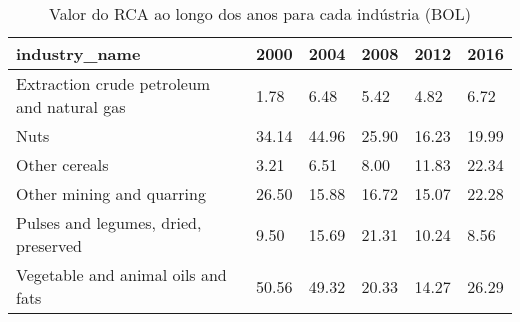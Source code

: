 \begin{table}
\centering
\caption{Valor do RCA ao longo dos anos para cada indústria (BOL)}
\begin{tabular}{p{6cm}p{1.5cm}p{1.5cm}p{1.5cm}p{1.5cm}p{1.5cm}}
\toprule
                             industry\_name &  2000 &  2004 &  2008 &  2012 &  2016 \\
\midrule
Extraction crude petroleum and natural gas &  1.78 &  6.48 &  5.42 &  4.82 &  6.72 \\
                                      Nuts & 34.14 & 44.96 & 25.90 & 16.23 & 19.99 \\
                             Other cereals &  3.21 &  6.51 &  8.00 & 11.83 & 22.34 \\
                 Other mining and quarring & 26.50 & 15.88 & 16.72 & 15.07 & 22.28 \\
      Pulses and legumes, dried, preserved &  9.50 & 15.69 & 21.31 & 10.24 &  8.56 \\
        Vegetable and animal oils and fats & 50.56 & 49.32 & 20.33 & 14.27 & 26.29 \\
\bottomrule
\end{tabular}
\end{table}
